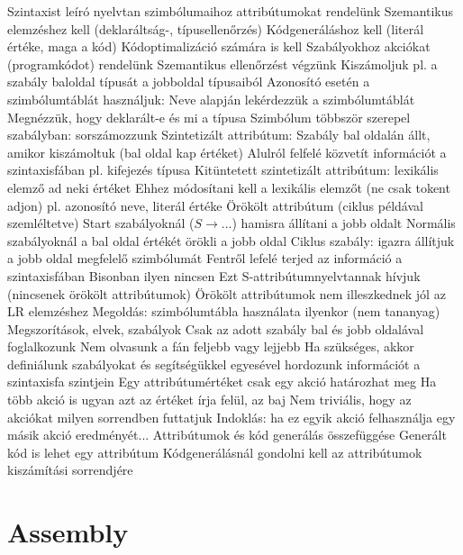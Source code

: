 \documentclass[12pt,a4paper]{article}
\begin{document}
\begin{outline}
	\1 Szintaxist leíró nyelvtan szimbólumaihoz attribútumokat rendelünk
		\2 Szemantikus elemzéshez kell (deklaráltság-, típusellenőrzés)
		\2 Kódgeneráláshoz kell (literál értéke, maga a kód)
		\2 Kódoptimalizáció számára is kell
	\1 Szabályokhoz akciókat (programkódot) rendelünk
		\2 Szemantikus ellenőrzést végzünk
		\2 Kiszámoljuk pl. a szabály baloldal típusát a jobboldal típusaiból
		\2 Azonosító esetén a szimbólumtáblát használjuk:
			\3 Neve alapján lekérdezzük a szimbólumtáblát
			\3 Megnézzük, hogy deklarált-e és mi a típusa
		\2 Szimbólum többször szerepel szabályban: sorszámozzunk
	\1 Szintetizált attribútum:
		\2 Szabály bal oldalán állt, amikor kiszámoltuk (bal oldal kap értéket)
		\2 Alulról felfelé közvetít információt a szintaxisfában
		\2 pl. kifejezés típusa
	\1 Kitüntetett szintetizált attribútum: lexikális elemző ad neki értéket
		\2 Ehhez módosítani kell a lexikális elemzőt (ne csak tokent adjon)
		\2 pl. azonosító neve, literál értéke
	\1 Örökölt attribútum (ciklus példával szemléltetve)
		\2 Start szabályoknál ($S \to ...$) hamisra állítani a jobb oldalt
		\2 Normális szabályoknál a bal oldal értékét örökli a jobb oldal
		\2 Ciklus szabály: igazra állítjuk a jobb oldal megfelelő szimbólumát
		\2 Fentről lefelé terjed az információ a szintaxisfában
		\2 Bisonban ilyen nincsen
			\3 Ezt S-attribútumnyelvtannak hívjuk (nincsenek örökölt attribútumok)
			\3 Örökölt attribútumok nem illeszkednek jól az LR elemzéshez
			\3 Megoldás: szimbólumtábla használata ilyenkor (nem tananyag)
	\1 Megszorítások, elvek, szabályok
		\2 Csak az adott szabály bal és jobb oldalával foglalkozunk
			\3 Nem olvasunk a fán feljebb vagy lejjebb
			\3 Ha szükséges, akkor definiálunk szabályokat és segítségükkel egyesével hordozunk információt a szintaxisfa szintjein
		\2 Egy attribútumértéket csak egy akció határozhat meg
			\3 Ha több akció is ugyan azt az értéket írja felül, az baj
	\1 Nem triviális, hogy az akciókat milyen sorrendben futtatjuk
		\2 Indoklás: ha ez egyik akció felhasználja egy másik akció eredményét...
	\1 Attribútumok és kód generálás összefüggése
		\2 Generált kód is lehet egy attribútum
		\2 Kódgenerálásnál gondolni kell az attribútumok kiszámítási sorrendjére
\end{outline}

\pagebreak

\section{Assembly}
\end{document}
